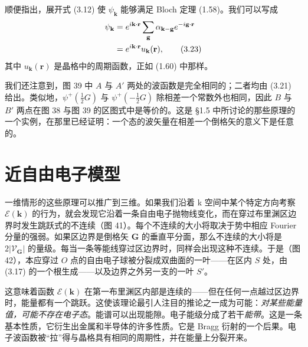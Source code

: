 
顺便指出，展开式 (3.12) 使 $\psi_{\mathbf{k}}$ 能够满足 Bloch 定理 (1.58)。我们可以写成
\begin{align*}
\psi_{\mathbf{k}} &= e^{i\mathbf{k}\cdot\mathbf{r}}\sum_{\mathbf{g}}\alpha_{\mathbf{k}-\mathbf{g}}e^{-i\mathbf{g}\cdot\mathbf{r}}\notag \\
&= e^{i\mathbf{k}\cdot\mathbf{r}}u_{\mathbf{k}}(\mathbf{r}), \tag{3.23}
\end{align*}
其中 $u_{\mathbf{k}}(\mathbf{r})$ 是晶格中的周期函数，正如 (1.60) 中那样。


我们还注意到，图 39 中 $A$ 与 $A'$ 两处的波函数是完全相同的；二者均由 (3.21) 给出。类似地，$\psi^{+}(\frac{1}{2}G)$ 与 $\psi^{+}(-\frac{1}{2}G)$ 除相差一个常数外也相同，因此 $B$ 与 $B'$ 两点在图 38 与图 39 的区图式中是等价的。这是 §1.5 中所讨论的那些原理的一个实例，在那里已经证明：一个态的波矢量在相差一个倒格矢的意义下是任意的。

\section{近自由电子模型}

一维情形的这些原理可以推广到三维。如果我们沿着 k 空间中某个特定方向考察 $\mathcal{E}(\mathbf{k})$ 的行为，就会发现它沿着一条自由电子抛物线变化，而在穿过布里渊区边界时发生跳跃式的不连续（图 41）。每个不连续的大小将取决于势中相应 Fourier 分量的强弱。如果区边界是倒格矢 $\mathbf{G}$ 的垂直平分面，那么不连续的大小将是 $2|\mathcal{V}_{\mathbf{G}}|$ 的量级。每当一条等能线穿过区边界时，同样会出现这种不连续。于是（图 42），本应穿过 $O$ 点的自由电子球被分裂成双曲面的一叶——在区内 $S$ 处，由 (3.17) 的一个根生成——以及边界之外另一支的一叶 $S'$。



这意味着函数 $\mathcal{E}(\mathbf{k})$ 在第一布里渊区内部是连续的——但在任何一点越过区边界时，能量都有一个跳跃。这使该理论最引人注目的推论之一成为可能：\emph{对某些能量值，可能不存在电子态}。能谱可以出现能隙。电子能级分成了若干\emph{能带}。这是一条基本性质，它衍生出金属和半导体的许多性质。它是 Bragg 衍射的一个后果。电子波函数被“拉”得与晶格具有相同的周期性，并在能量上分裂开来。

